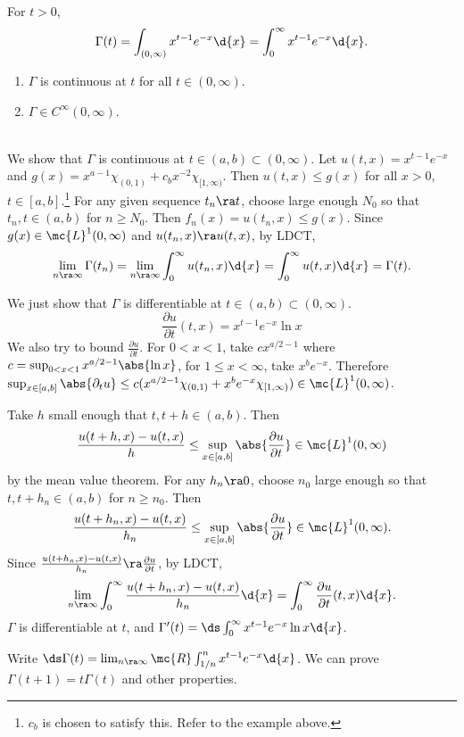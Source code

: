 \pagebreak

\recall {} For \(t > 0\),
\[
    \Gamma(t) = \int_{(0, \infty)} x^{t-1} e^{-x} \d{x} = \int_0^\infty x^{t-1} e^{-x} \d{x}.
\]
\begin{enumerate}
    \item \(\Gamma\) is continuous at \(t\) for all \(t \in (0, \infty)\).
    \item \(\Gamma \in C^\infty(0, \infty)\).
\end{enumerate}

\pf \\
 We show that \(\Gamma\) is continuous at \(t \in (a, b) \subset (0, \infty)\). Let \(u(t, x) = x^{t-1}e^{-x}\) and \(g(x) = x^{a - 1} \chi_{(0, 1)} + c_b x^{-2} \chi_{[1, \infty)}\). Then \(u(t, x) \leq g(x)\) for all \(x > 0\), \(t \in [a, b]\).\footnote{\(c_b\) is chosen to satisfy this. Refer to the example above.} For any given sequence \(t_n \ra t\), choose large enough \(N_0\) so that \(t_n, t \in (a, b)\) for \(n\geq N_0\). Then \(f_n(x) = u(t_n, x) \leq g(x)\). Since \(g(x) \in \mc{L}^{1}(0, \infty)\) and \(u(t_n, x) \ra u(t, x)\), by LDCT,
\[
    \lim_{n \ra \infty} \Gamma(t_n) = \lim_{n \ra \infty} \int_{0}^{\infty} u(t_n, x) \d{x} = \int_0^\infty u(t, x) \d{x} = \Gamma(t).
\]

 We just show that \(\Gamma\) is differentiable at \(t \in (a, b) \subset (0, \infty)\).
\[
    \frac{\partial u}{\partial t}(t, x) = x^{t-1} e^{-x} \ln x
\]
We also try to bound \(\frac{\partial u}{\partial t}\). For \(0 < x < 1\), take \(c x^{a/2-1}\) where \(c = \sup_{0<x<1} x^{a/2 - 1} \abs{\ln x}\), for \(1 \leq x < \infty\), take \(x^b e^{-x}\). Therefore \(\sup_{x \in [a, b]} \abs{\partial_t u} \leq c(x^{a/2 -1} \chi_{(0, 1)} + x^be^{-x} \chi_{[1, \infty)}) \in \mc{L}^{1}(0, \infty)\).

Take \(h\) small enough that \(t, t+h \in (a, b)\). Then
\[
    \frac{u(t+h, x) - u(t, x)}{h} \leq \sup_{x \in [a, b]} \abs{\frac{\partial u}{\partial t}} \in \mc{L}^{1}(0, \infty)
\]
by the mean value theorem. For any \(h_n \ra 0\), choose \(n_0\) large enough so that \(t, t + h_n \in (a, b)\) for \(n \geq n_0\). Then
\[
    \frac{u(t+h_n, x) - u(t, x)}{h_n} \leq \sup_{x \in [a, b]} \abs{\frac{\partial u}{\partial t}} \in \mc{L}^{1}(0, \infty).
\]
Since \(\frac{u(t+h_n, x) - u(t, x)}{h_n} \ra \frac{\partial u}{\partial t}\), by LDCT,
\[
    \lim_{n \ra \infty}\int_0^\infty \frac{u(t+h_n, x) - u(t, x)}{h_n} \d{x} = \int_0^\infty \frac{\partial u}{\partial t}(t, x) \d{x}.
\]
\(\Gamma\) is differentiable at \(t\), and \(\Gamma'(t) = \ds\int_0^\infty x^{t-1} e^{-x} \ln x \d{x}\).

\rmk Write \(\ds \Gamma(t) = \lim_{n \ra \infty} \mc{R} \int_{1/n}^{n} x^{t-1}e^{-x} \d{x}\). We can prove \(\Gamma(t + 1) = t \Gamma(t)\) and other properties.

\pagebreak
